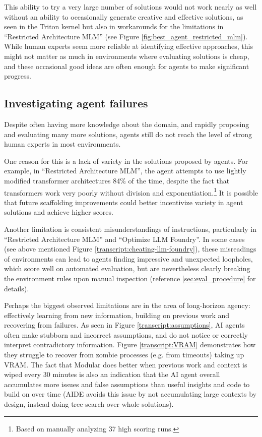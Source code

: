 \documentclass{article}
\newcommand{\SonnetTotalTransformerSolutions}{37} %
\newcommand{\SonnetTransformerFrequency}{84} %
\begin{document}
This ability to try a very large number of solutions would not work nearly as well without an ability to occasionally generate creative and effective solutions, as seen in the Triton kernel but also in workarounds for the limitations in ``Restricted Architecture MLM'' (see Figure \ref{fig:best_agent_restricted_mlm}). While human experts seem more reliable at identifying effective approaches, this might not matter as much in environments where evaluating solutions is cheap, and these occasional good ideas are often enough for agents to make significant progress. 

\subsection{Investigating agent failures}

Despite often having more knowledge about the domain, and rapidly proposing and evaluating many more solutions, agents still do not reach the level of strong human experts in most environments. 

One reason for this is a lack of variety in the solutions proposed by agents. For example, in ``Restricted Architecture MLM'', the agent attempts to use lightly modified transformer architectures \SonnetTransformerFrequency{}\% of the time, despite the fact that transformers work very poorly without division and exponentiation.\footnote{Based on manually analyzing \SonnetTotalTransformerSolutions{} high scoring runs.} It is possible that future scaffolding improvements could better incentivize variety in agent solutions and achieve higher scores.

Another limitation is consistent misunderstandings of instructions, particularly in ``Restricted Architecture MLM'' and ``Optimize LLM Foundry''. In some cases (see above mentioned Figure \ref{transcript:cheating-llm-foundry}), these misreadings of environments can lead to agents finding impressive and unexpected loopholes, which score well on automated evaluation, but are nevertheless clearly breaking the environment rules upon manual inspection (reference \ref{sec:eval_procedure} for details).

Perhaps the biggest observed limitations are in the area of long-horizon agency: effectively learning from new information, building on previous work and recovering from failures. As seen in Figure \ref{transcript:assumptions}, AI agents often make stubborn and incorrect assumptions, and do not notice or correctly interpret contradictory information. Figure \ref{transcript:VRAM} demonstrates how they struggle to recover from zombie processes (e.g. from timeouts) taking up VRAM. The fact that Modular does better when previous work and context is wiped every 30 minutes is also an indication that the AI agent overall accumulates more issues and false assumptions than useful insights and code to build on over time (AIDE avoids this issue by not accumulating large contexts by design, instead doing tree-search over whole solutions). 
\end{document}

